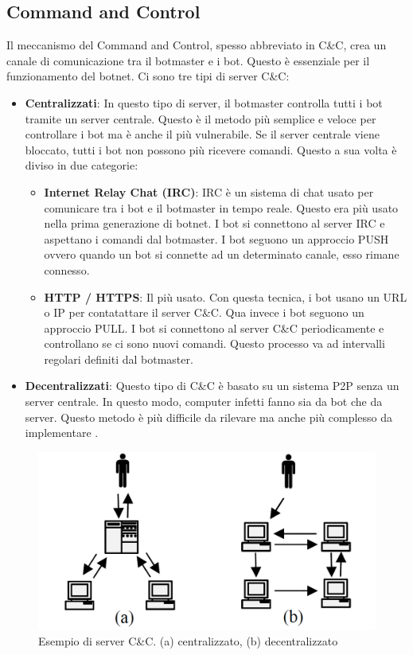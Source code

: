 \documentclass[12pt,a4paper,openright,twoside]{book}
\begin{document}
\subsection{Command and Control} 

Il meccanismo del Command and Control, spesso abbreviato in C\&C, crea un canale di comunicazione
tra il botmaster e i bot. Questo è essenziale per il funzionamento
del botnet. Ci sono tre tipi di server C\&C:

\begin{itemize}
    \item \textbf{Centralizzati}: In questo tipo di server, il botmaster
    controlla tutti i bot tramite un server centrale. Questo è il metodo
    più semplice e veloce per controllare i bot ma è anche il più vulnerabile.
    Se il server centrale viene bloccato, tutti i bot non possono più
    ricevere comandi. Questo a sua volta è diviso in due categorie:
    \begin{itemize}
        \item \textbf{Internet Relay Chat (IRC)}: IRC è un sistema di chat
        usato per comunicare tra i bot e il botmaster in tempo reale.
        Questo era più usato nella prima generazione di botnet. 
        I bot si connettono al server IRC e aspettano
        i comandi dal botmaster. I bot seguono un approccio PUSH ovvero
        quando un bot si connette ad un determinato canale, esso rimane connesso.
        \item \textbf{HTTP / HTTPS}: Il più usato. Con questa tecnica, i bot usano un URL o IP
        per contatattare il server C\&C. Qua invece i bot seguono
        un approccio PULL. I bot si connettono al server C\&C
        periodicamente e controllano se ci sono nuovi comandi. Questo processo
        va ad intervalli regolari definiti dal botmaster.
    \end{itemize}

    \item \textbf{Decentralizzati}: Questo tipo di C\&C
    è basato su un sistema P2P senza un server centrale. In questo modo,
    computer infetti fanno sia da bot che da server.
    Questo metodo è più difficile da rilevare ma anche
    più complesso da implementare \cite{4804459}.

\end{itemize}

\begin{figure}[H]
    \centering
    \includegraphics[width=.8\linewidth]{figures/Types-of-CC.png}
    \caption{Esempio di server C\&C. (a) centralizzato, (b) decentralizzato \cite{6487169}}
    \label{fig:command and control}
\end{figure}
\end{document}
